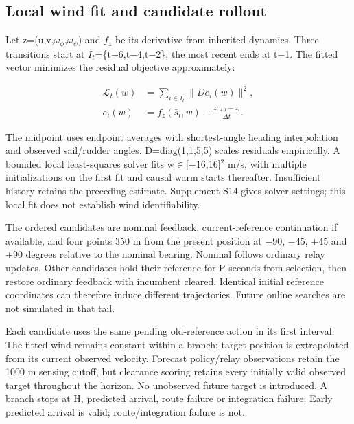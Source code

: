 \documentclass[conference]{IEEEtran}
\begin{document}
\subsection{Local wind fit and candidate rollout}

Let z=(u,v,$\omega_\phi$,$\omega_\psi$) and $f_z$ be its derivative from inherited dynamics. Three transitions start at $I_t$=\{t\ensuremath{-}6,t\ensuremath{-}4,t\ensuremath{-}2\}; the most recent ends at t\ensuremath{-}1. The fitted vector minimizes the residual objective approximately:

\begin{equation}\label{eq:2}
\begin{aligned}\mathcal L_t(w)&=\sum_{i\in I_t}\|D e_i(w)\|^2,\\e_i(w)&=f_z(\bar s_i,w)-\frac{z_{i+1}-z_i}{\Delta t}.\end{aligned}
\end{equation}

The midpoint uses endpoint averages with shortest-angle heading interpolation and observed sail/rudder angles. D=diag(1,1,5,5) scales residuals empirically. A bounded local least-squares solver fits w\ensuremath{\in}[\ensuremath{-}16,16]\ensuremath{^2} m/s, with multiple initializations on the first fit and causal warm starts thereafter. Insufficient history retains the preceding estimate. Supplement S14 gives solver settings; this local fit does not establish wind identifiability.

The ordered candidates are nominal feedback, current-reference continuation if available, and four points 350 m from the present position at \ensuremath{-}90, \ensuremath{-}45, +45 and +90 degrees relative to the nominal bearing. Nominal follows ordinary relay updates. Other candidates hold their reference for P seconds from selection, then restore ordinary feedback with incumbent cleared. Identical initial reference coordinates can therefore induce different trajectories. Future online searches are not simulated in that tail.

Each candidate uses the same pending old-reference action in its first interval. The fitted wind remains constant within a branch; target position is extrapolated from its current observed velocity. Forecast policy/relay observations retain the 1000 m sensing cutoff, but clearance scoring retains every initially valid observed target throughout the horizon. No unobserved future target is introduced. A branch stops at H, predicted arrival, route failure or integration failure. Early predicted arrival is valid; route/integration failure is not.
\end{document}
